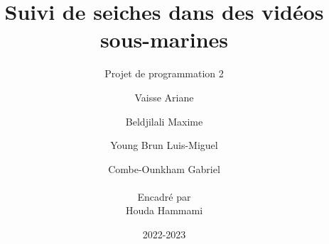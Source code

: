 \documentclass[12pt, a4paper]{scrbook}
\title{ Suivi de seiches dans des vidéos sous-marines}
\subtitle{Projet de programmation 2 }         %
\author{ Vaisse Ariane \and Beldjilali Maxime \and Young Brun Luis-Miguel \and Combe-Ounkham Gabriel \\ \\
		\small{Encadré par} \\ \small{Houda Hammami}}
\date{2022-2023}
\begin{document}
\maketitle



\tableofcontents \clearpage

\listoffigures \clearpage

\listofalgorithms \clearpage

















\printbibliography


\end{document}
